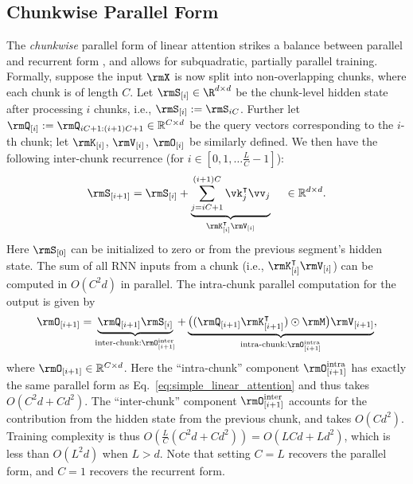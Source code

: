 \vspace{-3mm}
\subsection{Chunkwise Parallel Form} 
\vspace{-2mm}
\label{background:lin-chunkwise}

The \emph{chunkwise} parallel form of linear attention  strikes a balance between parallel and recurrent form \cite{GAU,sun2023retentive}, and allows for subquadratic, partially parallel training.
 Formally, suppose the input $\rmX$ is now split into non-overlapping chunks, where each chunk is of length $C$. 
Let $\rmS_{[i]} \in \R^{d \times d}$ be the chunk-level hidden state after processing $i$ chunks, i.e., $\rmS_{[i]}:=\rmS_{iC}$. Further let $\rmQ_{[i]}:=\rmQ_{iC+1:(i+1)C+1} \in \mathbb{R}^{C\times d}$ be the query vectors corresponding to the $i$-th chunk; let $\rmK_{[i]}$, $\rmV_{[i]}$, $\rmO_{[i]}$ be similarly defined. We then have the following inter-chunk recurrence (for $i \in [0, 1, \dots \frac{L}{C}-1]$):
    \begin{equation}
\rmS_{[i+1]} = \rmS_{[i]} + \underbrace{\sum_{j=iC + 1}^{(i+1)C} \vk_{j}^\intercal \vv_{j}}_{\rmK^\intercal_{[i]}\rmV_{[i]}} \quad \hspace{1mm} \in \mathbb{R}^{d\times d}.
\label{eq:la-inter-chunk}
    \end{equation}
Here  $\rmS_{[0]}$ can be initialized to  zero or from the previous segment's hidden state. The sum of all RNN inputs from a chunk (i.e., $\rmK^\intercal_{[i]}\rmV_{[i]}$) can be computed in $O(C^2d)$ in parallel.
The intra-chunk parallel computation for the output is given by
\begin{equation*}    
\rmO_{[i+1]} = \underbrace{\rmQ_{[i+1]}\rmS_{[i]}}_{\text{inter-chunk}: \rmO^\text{inter}_{[i+1]}} + \underbrace{\big((\rmQ_{[i+1]}\rmK_{[i+1]}^{\intercal})\odot\rmM\big)\rmV_{[i+1]}}_{\text{intra-chunk}: \rmO^{\text{intra}}_{[i+1]}},
\label{eq:la_block_wise}
\end{equation*}
where $\rmO_{[i+1]} \in \mathbb{R}^{C\times d}$. Here the ``intra-chunk'' component $\rmO^\text{intra}_{[i+1]}$  has exactly the same parallel form as Eq.~\ref{eq:simple_linear_attention} and thus takes $O(C^2d + Cd^2)$. The ``inter-chunk'' component $\rmO^\text{inter}_{[i+1]}$ accounts for the contribution from the hidden state from the previous chunk, and takes $O(Cd^2)$. Training complexity is thus  $O\left(\frac{L}{C}(C^2d + Cd^2) \right)=O(LCd+Ld^2)$, which is less than $O(L^2d)$ when $L>d$.  Note that setting $C = L$ recovers the parallel form, and $C=1$ recovers the recurrent form.


